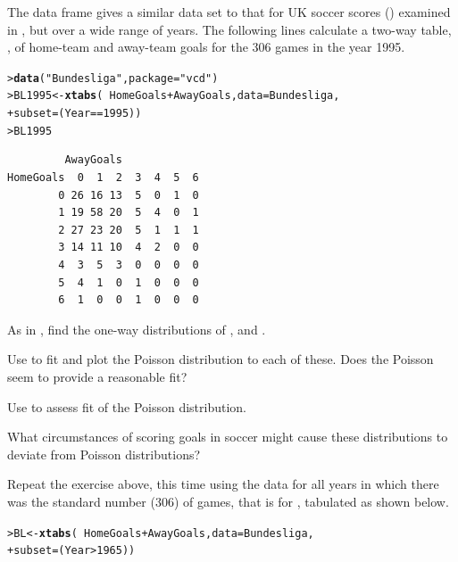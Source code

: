 \documentclass[10pt,krantz2]{krantz}\usepackage[]{graphicx}\usepackage[]{color}
\makeatletter
\newcommand{\hlnum}[1]{\textcolor[rgb]{0.686,0.059,0.569}{#1}}%
\newcommand{\hlstr}[1]{\textcolor[rgb]{0.192,0.494,0.8}{#1}}%
\newcommand{\hlopt}[1]{\textcolor[rgb]{0,0,0}{#1}}%
\newcommand{\hlstd}[1]{\textcolor[rgb]{0.345,0.345,0.345}{#1}}%
\newcommand{\hlkwb}[1]{\textcolor[rgb]{0.69,0.353,0.396}{#1}}%
\newcommand{\hlkwc}[1]{\textcolor[rgb]{0.333,0.667,0.333}{#1}}%
\newcommand{\hlkwd}[1]{\textcolor[rgb]{0.737,0.353,0.396}{\textbf{#1}}}%
\newenvironment{kframe}{%
 \def\at@end@of@kframe{}%
 \ifinner\ifhmode%
  \def\at@end@of@kframe{\end{minipage}}%
  \begin{minipage}{\columnwidth}%
 \fi\fi%
 \def\FrameCommand##1{\hskip\@totalleftmargin \hskip-\fboxsep
 \colorbox{shadecolor}{##1}\hskip-\fboxsep
     \hskip-\linewidth \hskip-\@totalleftmargin \hskip\columnwidth}%
 \MakeFramed {\advance\hsize-\width
   \@totalleftmargin\z@ \linewidth\hsize
   \@setminipage}}%
 {\par\unskip\endMakeFramed%
 \at@end@of@kframe}
\newenvironment{knitrout}{}{} %
\renewenvironment{knitrout}{\small\renewcommand{\baselinestretch}{.85}}{} %
\makeatother
\begin{document}
\begin{Exercises}
  \exercise The data frame  gives a similar data set to that for UK soccer scores
  ()
  examined in , but over a wide range of years.  The following lines calculate
  a two-way table, , of home-team and away-team goals
  for the 306 games in the year 1995.
\begin{knitrout}
\color{fgcolor}\begin{kframe}
\begin{alltt}
\hlstd{> }\hlkwd{data}\hlstd{(}\hlstr{"Bundesliga"}\hlstd{,} \hlkwc{package} \hlstd{=} \hlstr{"vcd"}\hlstd{)}
\hlstd{> }\hlstd{BL1995} \hlkwb{<-} \hlkwd{xtabs}\hlstd{(}\hlopt{~} \hlstd{HomeGoals} \hlopt{+} \hlstd{AwayGoals,} \hlkwc{data} \hlstd{= Bundesliga,}
\hlstd{+ }                \hlkwc{subset} \hlstd{= (Year} \hlopt{==} \hlnum{1995}\hlstd{))}
\hlstd{> }\hlstd{BL1995}
\end{alltt}
\begin{verbatim}
         AwayGoals
HomeGoals  0  1  2  3  4  5  6
        0 26 16 13  5  0  1  0
        1 19 58 20  5  4  0  1
        2 27 23 20  5  1  1  1
        3 14 11 10  4  2  0  0
        4  3  5  3  0  0  0  0
        5  4  1  0  1  0  0  0
        6  1  0  0  1  0  0  0
\end{verbatim}
\end{kframe}
\end{knitrout}
  \begin{enumerate*}
    \item As in , find the one-way distributions of ,
     and .
    \item Use  to fit and plot the Poisson distribution to each of these.  Does the
    Poisson seem to provide a reasonable fit?
    \item Use  to assess fit of the Poisson distribution.
    \item What circumstances of scoring goals in soccer might cause these distributions to
    deviate from Poisson distributions?
  \end{enumerate*}

  \item\hard
  Repeat the exercise above, this time using the data for all years in which there was
  the standard number (306) of games, that is for , tabulated as shown below.
\begin{knitrout}
\color{fgcolor}\begin{kframe}
\begin{alltt}
\hlstd{> }\hlstd{BL} \hlkwb{<-} \hlkwd{xtabs}\hlstd{(}\hlopt{~} \hlstd{HomeGoals} \hlopt{+} \hlstd{AwayGoals,} \hlkwc{data} \hlstd{= Bundesliga,}
\hlstd{+ }            \hlkwc{subset} \hlstd{= (Year} \hlopt{>} \hlnum{1965}\hlstd{))}
\end{alltt}
\end{kframe}
\end{knitrout}




\end{Exercises}
\end{document}
